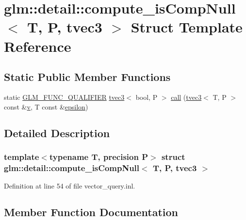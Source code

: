 \hypertarget{structglm_1_1detail_1_1compute__is_comp_null_3_01_t_00_01_p_00_01tvec3_01_4}{}\section{glm\+::detail\+::compute\+\_\+is\+Comp\+Null$<$ T, P, tvec3 $>$ Struct Template Reference}
\label{structglm_1_1detail_1_1compute__is_comp_null_3_01_t_00_01_p_00_01tvec3_01_4}
\subsection*{Static Public Member Functions}
\begin{DoxyCompactItemize}
\item 
static \mbox{\hyperlink{setup_8hpp_a33fdea6f91c5f834105f7415e2a64407}{G\+L\+M\+\_\+\+F\+U\+N\+C\+\_\+\+Q\+U\+A\+L\+I\+F\+I\+ER}} \mbox{\hyperlink{structglm_1_1tvec3}{tvec3}}$<$ bool, P $>$ \mbox{\hyperlink{structglm_1_1detail_1_1compute__is_comp_null_3_01_t_00_01_p_00_01tvec3_01_4_aeed450148ffffe117e96c998a31a78e6}{call}} (\mbox{\hyperlink{structglm_1_1tvec3}{tvec3}}$<$ T, P $>$ const \&\mbox{\hyperlink{glad_8h_a14cfbe2fc2234f5504618905b69d1e06}{v}}, T const \&\mbox{\hyperlink{group__gtc__constants_ga2a1e57fc5592b69cfae84174cbfc9429}{epsilon}})
\end{DoxyCompactItemize}


\subsection{Detailed Description}
\subsubsection*{template$<$typename T, precision P$>$\newline
struct glm\+::detail\+::compute\+\_\+is\+Comp\+Null$<$ T, P, tvec3 $>$}



Definition at line 54 of file vector\+\_\+query.\+inl.



\subsection{Member Function Documentation}
\mbox{\label{structglm_1_1detail_1_1compute__is_comp_null_3_01_t_00_01_p_00_01tvec3_01_4_aeed450148ffffe117e96c998a31a78e6}} 
